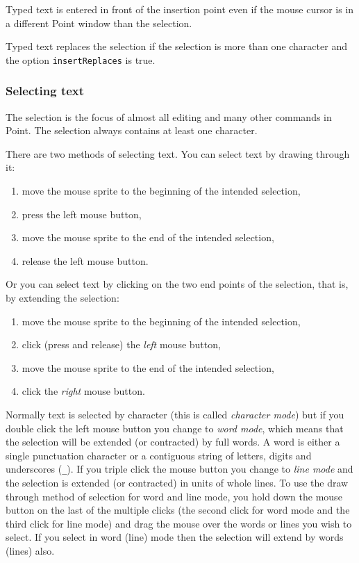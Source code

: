 Typed text is entered in front of the insertion point even
if the mouse cursor is in a different Point window than
the selection.

Typed text replaces the selection if the selection is more than
one character and the option {\tt insertReplaces} is true.


\subsubsection{Selecting text}

The selection is the focus of almost all editing and many other commands
in Point.
The selection always contains at least one character.

There are two methods of selecting text.
You can select text by drawing through it:
\begin{enumerate}
\item move the mouse sprite to the beginning of the intended selection,
\item press the left mouse button,
\item move the mouse sprite to the end of the intended selection,
\item release the left mouse button.
\end{enumerate}

Or you can select text by clicking on the two end points of the selection,
that is, by extending the selection:
\begin{enumerate}
\item move the mouse sprite to the beginning of the intended selection,
\item click (press and release) the {\em left} mouse button,
\item move the mouse sprite to the end of the intended selection,
\item click the {\em right} mouse button.
\end{enumerate}

Normally text is selected by character (this is called
{\em character mode}) but
if you double click the left mouse button
you change to {\em word mode}, which
means that the selection will be extended (or contracted) by full words.
A word is either a single punctuation character or a contiguous
string of letters, digits and underscores ({\tt \_}).
If you triple click the mouse button you change to {\em line mode}
and the selection is extended (or contracted) in units of whole lines.
To use the draw through method of selection for word and line mode,
you hold down the mouse button on the last of the multiple
clicks (the second click for word mode and the third click for line mode)
and drag the mouse over the words or lines you wish to select.
If you select in word (line) mode then the selection will extend
by words (lines) also.

